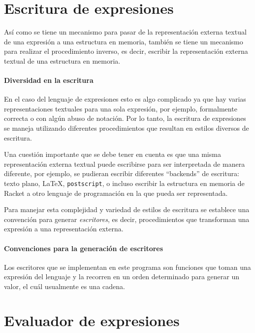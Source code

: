 \documentclass[letterpaper,twoside,openright,11pt]{book}
\begin{document}
\nwenddocs{}\section*{Escritura de expresiones}

Así como se tiene un mecanismo para pasar de la representación externa textual de una expresión a una estructura en memoria, también se tiene un mecanismo para realizar el procedimiento inverso, es decir, escribir la representación externa textual de una estructura en memoria.

\nwenddocs{}\paragraph{Diversidad en la escritura}
En el caso del lenguaje de expresiones esto es algo complicado ya que hay varias representaciones textuales para una sola expresión, por ejemplo, formalmente correcta o con algún abuso de notación. Por lo tanto, la escritura de expresiones se maneja utilizando diferentes procedimientos que resultan en estilos diversos de escritura.

Una cuestión importante que se debe tener en cuenta es que una misma representación externa textual puede escribirse para ser interpretada de manera diferente, por ejemplo, se pudieran escribir diferentes ``backends'' de escritura: texto plano, \LaTeX, {\tt{}postscript}, o incluso escribir la estructura en memoria de Racket a otro lenguaje de programación en la que pueda ser representada.

Para manejar esta complejidad y variedad de estilos de escritura se establece una convención para generar \emph{escritores}, es decir, procedimientos que transforman una expresión a una representación externa.

\nwenddocs{}\paragraph{Convenciones para la generación de escritores}

Los escritores que se implementan en este programa son funciones que toman una expresión del lenguaje y la recorren en un orden determinado para generar un valor, el cuál usualmente es una cadena.

\nwenddocs{}\section*{Evaluador de expresiones}
\end{document}
